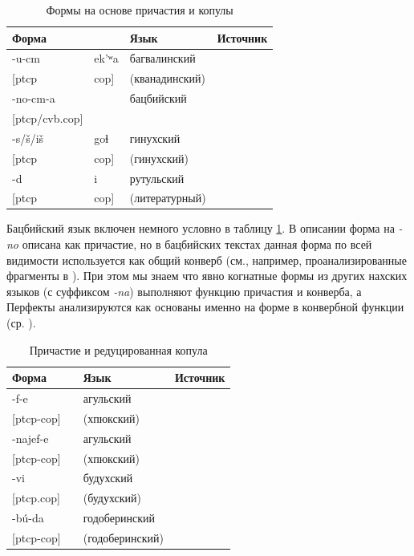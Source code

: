 \begin{table}[ht]
\caption{Формы на основе причастия и копулы}
\label{tab:ptcpcop}
\vspace{0.2cm}
\begin{center}
\begin{tabular}{ll|ll}
\multicolumn{2}{l|}{Форма} & Язык      & Источник               \\ \hline
-u-cm 	&	ek'ʷa 	&	багвалинский	&	\citep{maisaktatevosov2001}	\\
{[}ptcp	&	cop{]}	&	(кванадинский)	&		\\
-no-cm-a 	&		&	бацбийский	&	\citep{holiskygagua1994}	\\
{[}ptcp/cvb.cop{]}	&		&		&		\\
-s/š/iš 	&	goɬ 	&	гинухский	&	\citep{forker2013}	\\
{[}ptcp	&	cop{]}	&	(гинухский)	&		\\
-d  	&	i 	&	рутульский	&	\citep{maisaklezgpf}	\\
{[}ptcp 	&	cop{]}	&	(литературный)	&		\\
\end{tabular}
\end{center}
\end{table}

Бацбийский язык включен немного условно в таблицу \ref{tab:ptcpcop}. В описании \citep{holiskygagua1994} форма на \textit{-no} описана как причастие, но в бацбийских текстах данная форма по всей видимости используется как общий конверб (см., например, проанализированные фрагменты в \citep{nichols1981}). При этом мы знаем что явно когнатные формы из других нахских языков (с суффиксом \textit{-na}) выполняют функцию причастия и конверба, а Перфекты анализируются как основаны именно на форме в конвербной функции (ср. \citep{molochievanichols2018}). 

\begin{table}[ht]
\caption{Причастие и редуцированная копула}
\label{tab:ptcpredcop}
\vspace{0.2cm}
\begin{center}
\begin{tabular}{ll|ll}
\multicolumn{2}{l|}{Форма} & Язык      & Источник   \\ \hline
-f-e	&		&	агульский	&	\citep{maisaklezgpf}	\\
{[}ptcp-cop{]}	&		&	(хпюкский)	&		\\
-najef-e	&		&	агульский	&	\citep{maisakmerdanova2016}	\\
{[}ptcp-cop{]}	&		&	(хпюкский)	&		\\
-vi 	&		&	будухский	&	\citep{maisaklezgpf}	\\
{[}ptcp.cop{]}	&		&	(будухский)	&		\\
-bú-da 	&		&	годоберинский	&		\\
{[}ptcp-cop{]}	&		&	(годоберинский)	&		\\
\end{tabular}
\end{center}
\end{table}

